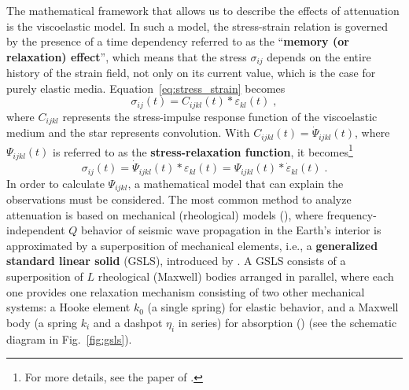 The mathematical framework that allows us to describe the effects of attenuation is the viscoelastic model. In such a model, the stress-strain relation is governed by the presence of a time dependency referred to as the \enquote{\textbf{memory (or relaxation) effect}}, which means that the stress $\sigma_{ij}$ depends on the entire history of the strain field, not only on its current value, which is the case for purely elastic media. 
Equation~\ref{eq:stress_strain} becomes
\begin{equation}
    \sigma_{ij}(t) = C_{ijkl}(t) \ast \varepsilon_{kl}(t)\;,
    \label{eq:stress_strain_visco}
\end{equation}
where $C_{ijkl}$ represents the stress-impulse response function of the viscoelastic medium and the star represents convolution. %
With $C_{ijkl}(t) = \dot{\Psi}_{ijkl}(t)$, where $\Psi_{ijkl}(t)$ is referred to as the \textbf{stress-relaxation function}, it becomes\footnote{For more details, see the paper of \citet{Bai:16}.}
\begin{equation}
    \sigma_{ij}(t) = \dot{\Psi}_{ijkl}(t) \ast \varepsilon_{kl}(t) = \Psi_{ijkl}(t) \ast \dot{\varepsilon}_{kl}(t)\;.
    \label{eq:stress_strain_visco_2.0}
\end{equation}
In order to calculate $\Psi_{ijkl}$, a mathematical model that can explain the observations must be considered. The most common method to analyze attenuation is based on mechanical (rheological) models (\cite{knopoff:58}), where frequency-independent $Q$ behavior of seismic wave propagation in the Earth's interior is approximated by a superposition of mechanical  elements, i.e., a \textbf{generalized standard linear solid} (GSLS), introduced by \citet{liu:76}. A GSLS consists of a superposition of $L$ rheological (Maxwell) bodies arranged in parallel, where each one provides one relaxation mechanism consisting of two other mechanical systems: a Hooke element $k_0$ (a single spring) for elastic behavior, and a Maxwell body (a spring $k_i$ and a dashpot $\eta_i$ in series) for absorption (\cite{blanch:95}) (see the schematic diagram in Fig.~\ref{fig:gsls}).
